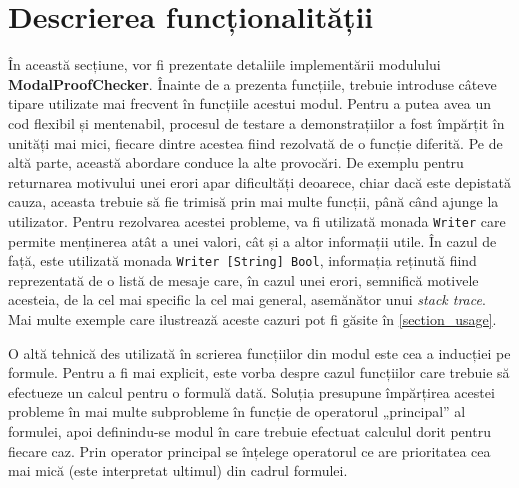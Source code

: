 \documentclass[12pt, openany]{book}
\newcommand{\mysectionreference}[1]{\autoref{#1}}
\begin{document}
        \section{Descrierea funcționalității} %
        \label{section_functionality}
            \par{}
                În această secțiune, vor fi prezentate detaliile implementării modulului \textbf{ModalProofChecker}. 
                Înainte de a prezenta funcțiile, trebuie introduse câteve tipare utilizate mai frecvent în funcțiile 
                acestui modul. Pentru a putea avea un cod flexibil și mentenabil, procesul de testare a demonstrațiilor 
                a fost împărțit în unități mai mici, fiecare dintre acestea fiind rezolvată de o funcție diferită. Pe de 
                altă parte, această abordare conduce la alte provocări. De exemplu pentru returnarea motivului unei 
                erori apar dificultăți deoarece, chiar dacă este depistată cauza, aceasta trebuie să fie trimisă prin 
                mai multe funcții, până când ajunge la utilizator. Pentru rezolvarea acestei probleme, va fi utilizată 
                monada \texttt{Writer} care permite menținerea atât a unei valori, cât și a altor informații utile. În 
                cazul de față, este utilizată monada \texttt{Writer [String] Bool}, informația reținută fiind 
                reprezentată de o listă de mesaje care, în cazul unei erori, semnifică motivele acesteia, de la cel mai 
                specific la cel mai general, asemănător unui \textit{stack trace}. Mai multe exemple care ilustrează 
                aceste cazuri pot fi găsite în \mysectionreference{section_usage}. 
                
            \par{}
                O altă tehnică des utilizată în scrierea funcțiilor din modul este cea a inducției pe formule. Pentru a 
                fi mai explicit, este vorba despre cazul funcțiilor care trebuie să efectueze un calcul pentru o formulă 
                dată. Soluția presupune împărțirea acestei probleme în mai multe subprobleme în funcție de operatorul 
                „principal” al formulei, apoi definindu-se modul în care trebuie efectuat calculul dorit pentru fiecare 
                caz. Prin operator principal se înțelege operatorul ce are prioritatea cea mai mică (este interpretat 
                ultimul) din cadrul formulei.
\end{document}
